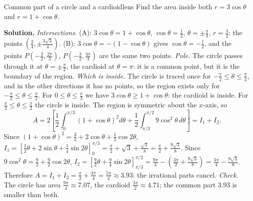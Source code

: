 \documentclass[11pt]{article}
\begin{document}
\begin{exmp}{Common part of a circle and a cardioid}{lens}
Find the area inside both $r=3\cos\theta$ and $r=1+\cos\theta$.

\textbf{Solution.} \emph{Intersections.} (A): $3\cos\theta=1+\cos\theta$, $\cos\theta=\frac12$, $\theta=\pm\frac\pi3$, $r=\frac32$: the points $\left(\frac34,\pm\frac{3\sqrt3}4\right)$. (B): $3\cos\theta=-(1-\cos\theta)$ gives $\cos\theta=-\frac12$, and the points $P\left(-\frac32,\frac{2\pi}3\right)$, $P\left(-\frac32,\frac{4\pi}3\right)$ are the same two points. \emph{Pole.} The circle passes through it at $\theta=\pm\frac\pi2$, the cardioid at $\theta=\pi$: it is a common point, but it is the boundary of the region. \emph{Which is inside.} The circle is traced once for $-\frac\pi2\le\theta\le\frac\pi2$, and in the other directions it has no points, so the region exists only for $-\frac\pi2\le\theta\le\frac\pi2$. For $0\le\theta\le\frac\pi3$ we have $3\cos\theta\ge1+\cos\theta$: the cardioid is inside. For $\frac\pi3\le\theta\le\frac\pi2$ the circle is inside. The region is symmetric about the $x$-axis, so
\[A=2\left[\frac12\int_0^{\pi/3}(1+\cos\theta)^2d\theta+\frac12\int_{\pi/3}^{\pi/2}9\cos^2\theta\,d\theta\right]=I_1+I_2 .\]
Since $(1+\cos\theta)^2=\frac32+2\cos\theta+\frac12\cos2\theta$, $I_1=\left[\frac32\theta+2\sin\theta+\frac14\sin2\theta\right]_0^{\pi/3}=\frac\pi2+\sqrt3+\frac{\sqrt3}8=\frac\pi2+\frac{9\sqrt3}8$. Since $9\cos^2\theta=\frac92+\frac92\cos2\theta$, $I_2=\left[\frac92\theta+\frac94\sin2\theta\right]_{\pi/3}^{\pi/2}=\frac{9\pi}4-\left(\frac{3\pi}2+\frac{9\sqrt3}8\right)=\frac{3\pi}4-\frac{9\sqrt3}8$. Therefore $A=I_1+I_2=\frac\pi2+\frac{3\pi}4=\frac{5\pi}4\approx3.93$: the irrational parts cancel.
\emph{Check.} The circle has area $\frac{9\pi}4\approx7.07$, the cardioid $\frac{3\pi}2\approx4.71$; the common part $3.93$ is smaller than both.


\end{exmp}
\end{document}
